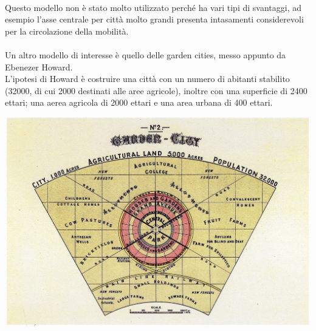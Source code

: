 \documentclass[a4paper,12pt, oneside]{book}
\begin{document}
   \leavevmode\\
   Questo modello non è stato molto utilizzato perché ha vari tipi di svantaggi, ad esempio l'asse centrale per città molto grandi presenta intasamenti considerevoli per la circolazione della mobilità.\\ \\
   Un altro modello di interesse è quello delle garden cities, messo appunto da Ebenezer Howard.\\
   L'ipotesi di Howard è costruire una città con un numero di abitanti stabilito (32000, di cui 2000 destinati alle aree agricole), inoltre con una superficie di 2400 ettari; una aerea agricola di 2000 ettari e una area urbana di 400 ettari.\\
   \begin{center}
   	\includegraphics[width=0.8\linewidth]{"immagini/garden cities"}
   	\label{fig:garden cities}
   \end{center}
   \leavevmode\\
\end{document}
